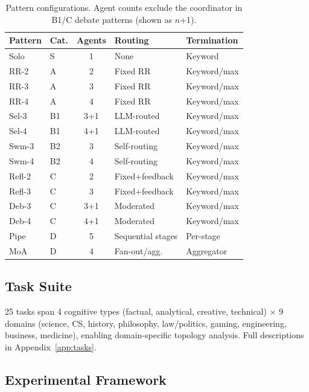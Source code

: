 \documentclass{article}
\begin{document}
\begin{table}[t]
\centering
\caption{Pattern configurations. Agent counts exclude the coordinator in B1/C debate patterns (shown as $n$+1).}
\label{tab:patterns}
{\small
\begin{tabular}{@{}llcll@{}}
\toprule
\textbf{Pattern} & \textbf{Cat.} & \textbf{Agents} & \textbf{Routing} & \textbf{Termination} \\
\midrule
Solo & S & 1 & None & Keyword \\
RR-2 & A & 2 & Fixed RR & Keyword/max \\
RR-3 & A & 3 & Fixed RR & Keyword/max \\
RR-4 & A & 4 & Fixed RR & Keyword/max \\
Sel-3 & B1 & 3+1 & LLM-routed & Keyword/max \\
Sel-4 & B1 & 4+1 & LLM-routed & Keyword/max \\
Swm-3 & B2 & 3 & Self-routing & Keyword/max \\
Swm-4 & B2 & 4 & Self-routing & Keyword/max \\
Refl-2 & C & 2 & Fixed+feedback & Keyword/max \\
Refl-3 & C & 3 & Fixed+feedback & Keyword/max \\
Deb-3 & C & 3+1 & Moderated & Keyword/max \\
Deb-4 & C & 4+1 & Moderated & Keyword/max \\
Pipe & D & 5 & Sequential stages & Per-stage \\
MoA & D & 4 & Fan-out/agg. & Aggregator \\
\bottomrule
\end{tabular}
}
\end{table}

\subsection{Task Suite}
\vspace{-1mm}

25 tasks span 4 cognitive types (factual, analytical, creative, technical) $\times$ 9 domains (science, CS, history, philosophy, law/politics, gaming, engineering, business, medicine), enabling domain-specific topology analysis. Full descriptions in Appendix~\ref{app:tasks}.

\subsection{Experimental Framework}
\vspace{-1mm}
\end{document}
